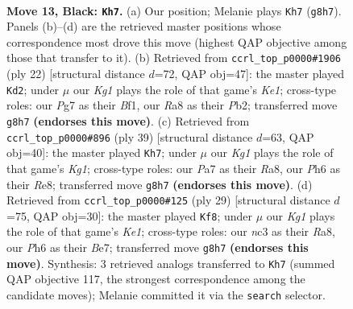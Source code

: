 \documentclass[11pt]{article}
\begin{document}
\clearpage

\begin{figure}[p]\centering
\begin{subfigure}{0.46\textwidth}\centering
\resizebox{\linewidth}{!}{%
\newchessgame
\chessboard[
  setfen={rn3rk1/ppp1bpp1/7p/4P3/2p2PbP/2N1P3/PP1N4/R3KB1R b KQ - 0 13},
  showmover=false,
  pgfstyle=straightmove, color=movearrow, markmove={g8-h7}
]}
\caption{}
\end{subfigure}\hfill
\begin{subfigure}{0.46\textwidth}\centering
\resizebox{\linewidth}{!}{%
\newchessgame
\chessboard[
  setfen={r1b1kb1r/p1p2ppp/1p6/3Pp3/1n2P3/4BP2/PP4PP/R3KBNR w KQkq - 0 12},
  showmover=false,
  pgfstyle=straightmove, color=movearrow, markmove={e1-d2}
]}
\caption{}
\end{subfigure}
\\[4pt]
\begin{subfigure}{0.46\textwidth}\centering
\resizebox{\linewidth}{!}{%
\newchessgame
\chessboard[
  setfen={r3r1kb/2pbpp2/p2p3B/7p/1nNPP2P/5P2/PP6/1K1R1B1R b - - 0 20},
  showmover=false,
  pgfstyle=straightmove, color=movearrow, markmove={g8-h7}
]}
\caption{}
\end{subfigure}\hfill
\begin{subfigure}{0.46\textwidth}\centering
\resizebox{\linewidth}{!}{%
\newchessgame
\chessboard[
  setfen={r1b1k2r/ppp1bpp1/2p5/4P2p/P2N4/7P/1PP2PP1/R1B1R1K1 b - - 2 15},
  showmover=false,
  pgfstyle=straightmove, color=movearrow, markmove={e8-f8}
]}
\caption{}
\end{subfigure}
\caption{\textbf{Move 13, Black: \texttt{Kh7}.} (a) Our position; Melanie plays \texttt{Kh7} (\texttt{g8h7}). Panels (b)--(d) are the retrieved master positions whose correspondence most drove this move (highest QAP objective among those that transfer to it). (b) Retrieved from \texttt{ccrl\_top\_p0000\#1906} (ply 22) [structural distance $d$=72, QAP obj=47]: the master played \texttt{Kd2}; under $\mu$ our \emph{Kg1} plays the role of that game's \emph{Ke1}; cross-type roles: our \emph{P}g7 as their \emph{B}f1, our \emph{R}a8 as their \emph{P}b2; transferred move \texttt{g8h7} \textbf{(endorses this move)}. (c) Retrieved from \texttt{ccrl\_top\_p0000\#896} (ply 39) [structural distance $d$=63, QAP obj=40]: the master played \texttt{Kh7}; under $\mu$ our \emph{Kg1} plays the role of that game's \emph{Kg1}; cross-type roles: our \emph{P}a7 as their \emph{R}a8, our \emph{P}h6 as their \emph{R}e8; transferred move \texttt{g8h7} \textbf{(endorses this move)}. (d) Retrieved from \texttt{ccrl\_top\_p0000\#125} (ply 29) [structural distance $d$=75, QAP obj=30]: the master played \texttt{Kf8}; under $\mu$ our \emph{Kg1} plays the role of that game's \emph{Ke1}; cross-type roles: our \emph{n}c3 as their \emph{R}a8, our \emph{P}h6 as their \emph{B}e7; transferred move \texttt{g8h7} \textbf{(endorses this move)}. Synthesis: 3 retrieved analogs transferred to \texttt{Kh7} (summed QAP objective 117, the strongest correspondence among the candidate moves); Melanie committed it via the \texttt{search} selector.}
\label{fig:thought-m25}
\end{figure}
\end{document}
